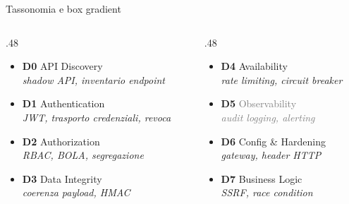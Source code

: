 
\begin{frame}{Tassonomia e box gradient}
      \begin{columns}
            \begin{column}{.48\textwidth}
                  \begin{itemize}
                        \item \textbf{D0} \alert{API Discovery}\\
                              {\scriptsize\itshape shadow API, inventario endpoint}

                        \item \textbf{D1} \alert{Authentication}\\
                              {\scriptsize\itshape JWT, trasporto credenziali, revoca}

                        \item \textbf{D2} \alert{Authorization}\\
                              {\scriptsize\itshape RBAC, BOLA, segregazione}

                        \item \textbf{D3} \alert{Data Integrity}\\
                              {\scriptsize\itshape coerenza payload, HMAC}
                  \end{itemize}
            \end{column}

            \begin{column}{.48\textwidth}
                  \begin{itemize}
                        \item \textbf{D4} \alert{Availability}\\
                              {\scriptsize\itshape rate limiting, circuit breaker}

                        \item \textbf{D5} \textcolor{gray}{Observability}\\
                              {\scriptsize\itshape\textcolor{gray}{audit logging, alerting}}

                        \item \textbf{D6} \alert{Config \& Hardening}\\
                              {\scriptsize\itshape gateway, header HTTP}

                        \item \textbf{D7} \alert{Business Logic}\\
                              {\scriptsize\itshape SSRF, race condition}
                  \end{itemize}
            \end{column}
      \end{columns}


\end{frame}
